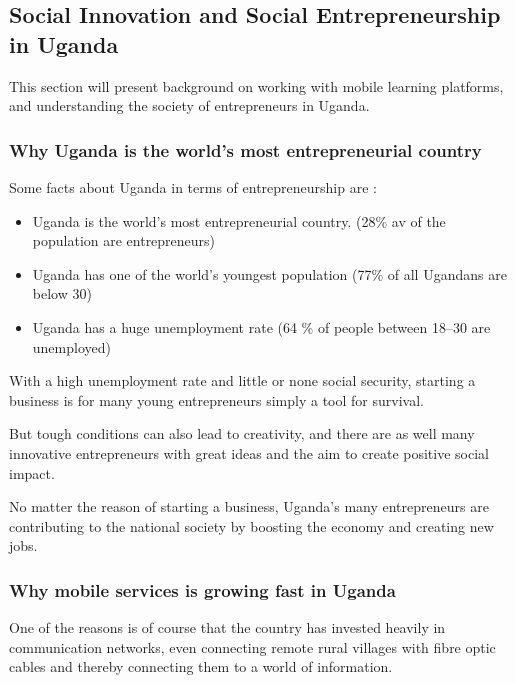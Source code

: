 \subsection{Social Innovation and Social Entrepreneurship in Uganda} %

    This section will present background on working with mobile learning platforms, and understanding the society of entrepreneurs in Uganda.

    \subsubsection{Why Uganda is the world's most entrepreneurial country}
    Some facts about Uganda in terms of entrepreneurship are \cite{nissar}:

    \begin{itemize}
      \item Uganda is the world's most entrepreneurial country. (28\% av of the population are entrepreneurs)
        \item Uganda has one of the world's youngest population (77\% of all Ugandans are below 30)
        \item Uganda has a huge unemployment rate (64 \% of people between 18–30 are unemployed)
    \end{itemize}


    With a high unemployment rate and little or none social security, starting a business is for many young entrepreneurs simply a tool for survival.

    But tough conditions can also lead to creativity, and there are as well many innovative entrepreneurs with great ideas and the aim to create positive social impact.

    No matter the reason of starting a business, Uganda’s many entrepreneurs are contributing to the national society by boosting the economy and creating new jobs.

    \subsubsection{Why mobile services is growing fast in Uganda}
    One of the reasons is of course that the country has invested heavily in communication networks, even connecting remote rural villages with fibre optic cables and thereby connecting them to a world of information.

